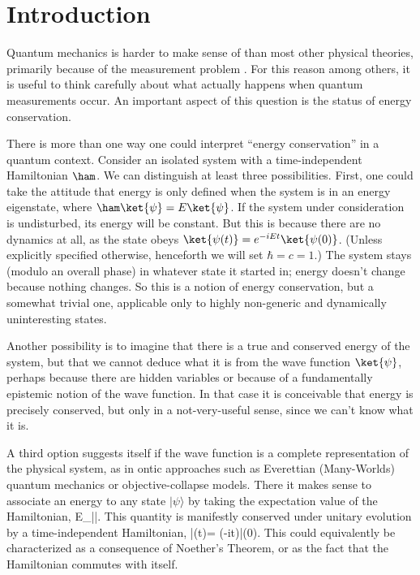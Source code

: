 \documentclass[12pt,aps,prd,onecolumn,nofootinbib,notitlepage]{revtex4-1}
\begin{document}
\maketitle

\newpage

\section{Introduction}

Quantum mechanics is harder to make sense of than most other physical theories, primarily because of the measurement problem \cite{Wallace2007-WALTQM}.
For this reason among others, it is useful to think carefully about what actually happens when quantum measurements occur.
An important aspect of this question is the status of energy conservation.

There is more than one way one could interpret ``energy conservation'' in a quantum context.
Consider an isolated system with a time-independent Hamiltonian $\ham$.
We can distinguish at least three possibilities.
First, one could take the attitude that energy is only {defined} when the system is in an energy eigenstate, where $\ham\ket{\psi} = E\ket{\psi}$.
If the system under consideration is undisturbed, its energy will be constant.
But this is because there are no dynamics at all, as the state obeys $\ket{\psi(t)} = e^{-iE t }\ket{\psi(0)}$.
(Unless explicitly specified otherwise, henceforth we will set $\hbar=c=1$.)
The system stays (modulo an overall phase) in whatever state it started in; energy doesn't change because nothing changes.
So this is a notion of energy conservation, but a somewhat trivial one, applicable only to highly non-generic and dynamically uninteresting states.

Another possibility is to imagine that there is a true and conserved energy of the system, but that we cannot deduce what it is from the wave function $\ket{\psi}$, perhaps because there are hidden variables or because of a fundamentally epistemic notion of the wave function.
In that case it is conceivable that energy is precisely conserved, but only in a not-very-useful sense, since we can't know what it is.

A third option suggests itself if the wave function is a complete representation of the physical system, as in ontic approaches such as Everettian (Many-Worlds) quantum mechanics or objective-collapse models.
There it makes sense to associate an energy to any state $|\psi\rangle$ by taking the expectation value of the Hamiltonian,
\be
  E_\psi \equiv \langle \psi|\ham |\psi\rangle.
  \label{energydef}
\ee
This quantity is manifestly conserved under unitary evolution by a time-independent Hamiltonian, 
\be
|\psi(t)\rangle = \exp(-i\ham t)|\psi(0)\rangle.
\ee
This could equivalently be characterized as a consequence of Noether's Theorem, or as the fact that the Hamiltonian commutes with itself.
\end{document}
